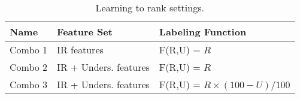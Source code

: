 \begin{table}[!t]
\centering
\caption{Learning to rank settings. }
\label{tab:ltr}
\begin{tabular}{l|l|l}
\toprule 
Name & Feature Set & Labeling Function\tabularnewline
\midrule 
Combo 1 & IR features & F(R,U) = $R$\tabularnewline
Combo 2 & IR + Unders. features & F(R,U) = $R$ \tabularnewline
Combo 3 & IR + Unders. features & F(R,U) = $R \times (100 - U)/100$ \tabularnewline
\bottomrule
\end{tabular}
\end{table}
